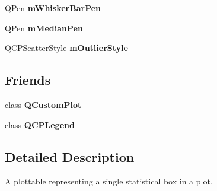 \begin{DoxyCompactItemize}
\item 
\hypertarget{classQCPStatisticalBox_aa719b1d722a9f82364df1497a6dc1da8}{\-Q\-Pen {\bfseries m\-Whisker\-Bar\-Pen}}\label{classQCPStatisticalBox_aa719b1d722a9f82364df1497a6dc1da8}

\item 
\hypertarget{classQCPStatisticalBox_a1af5b601049c575f778ae270f40c9443}{\-Q\-Pen {\bfseries m\-Median\-Pen}}\label{classQCPStatisticalBox_a1af5b601049c575f778ae270f40c9443}

\item 
\hypertarget{classQCPStatisticalBox_ae102e4187e1e6ba1f2df0f622b5171a4}{\hyperlink{classQCPScatterStyle}{\-Q\-C\-P\-Scatter\-Style} {\bfseries m\-Outlier\-Style}}\label{classQCPStatisticalBox_ae102e4187e1e6ba1f2df0f622b5171a4}

\end{DoxyCompactItemize}
\subsection*{\-Friends}
\begin{DoxyCompactItemize}
\item 
\hypertarget{classQCPStatisticalBox_a1cdf9df76adcfae45261690aa0ca2198}{class {\bfseries \-Q\-Custom\-Plot}}\label{classQCPStatisticalBox_a1cdf9df76adcfae45261690aa0ca2198}

\item 
\hypertarget{classQCPStatisticalBox_a8429035e7adfbd7f05805a6530ad5e3b}{class {\bfseries \-Q\-C\-P\-Legend}}\label{classQCPStatisticalBox_a8429035e7adfbd7f05805a6530ad5e3b}

\end{DoxyCompactItemize}


\subsection{\-Detailed \-Description}
\-A plottable representing a single statistical box in a plot. 



